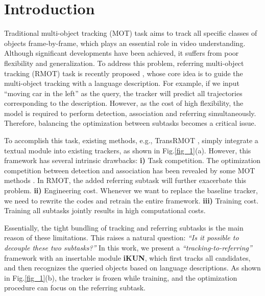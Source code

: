 \documentclass[10pt,twocolumn,letterpaper]{article}
\begin{document}
\section{Introduction}
    Traditional multi-object tracking (MOT) task aims to track all specific classes of objects frame-by-frame, which plays an essential role in video understanding.
    Although significant developments have been achieved, it suffers from poor flexibility and generalization.
    To address this problem, referring multi-object tracking (RMOT) task is recently proposed \cite{wu2023referring},
    whose core idea is to guide the multi-object tracking with a language description.
    For example, if we input ``moving car in the left'' as the query, the tracker will predict all trajectories corresponding to the description.
    However, as the cost of high flexibility, the model is required to perform detection, association and referring simultaneously.
    Therefore, balancing the optimization between subtasks becomes a critical issue.

    To accomplish this task, existing methods, e.g., TransRMOT \cite{wu2023referring}, 
    simply integrate a textual module into existing trackers, as shown in Fig.\ref{fig_1}(a).
    However, this framework has several intrinsic drawbacks:
    \textbf{i)} Task competition. 
    The optimization competition between detection and association has been revealed by some MOT methods \cite{liang2022rethinking, zhang2023motrv2}.
    In RMOT, the added referring subtask will further exacerbate this problem.
    \textbf{ii)} Engineering cost.
    Whenever we want to replace the baseline tracker, we need to rewrite the codes and retrain the entire framework.
    \textbf{iii)} Training cost. 
    Training all subtasks jointly results in high computational costs.

    Essentially, the tight bundling of tracking and referring subtasks is the main reason of these limitations.
    This raises a natural question: \textit{``Is it possible to decouple these two subtasks?''}
    In this work, we present a \textit{``tracking-to-referring''} framework with an insertable module \textbf{iKUN}, 
    which first tracks all candidates, and then recognizes the queried objects based on language descriptions.
    As shown in Fig.\ref{fig_1}(b), the tracker is frozen while training, and the optimization procedure can focus on the referring subtask.
\end{document}
